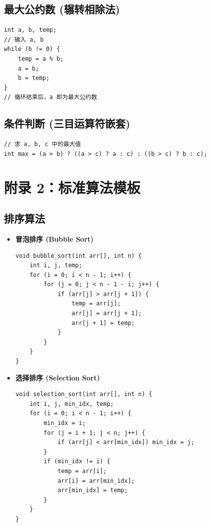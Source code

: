 \documentclass[a4paper,12pt]{article}
\begin{document}
\subsection{最大公约数 (辗转相除法)}
\begin{lstlisting}
int a, b, temp;
// 输入 a, b
while (b != 0) {
    temp = a % b;
    a = b;
    b = temp;
}
// 循环结束后，a 即为最大公约数
\end{lstlisting}

\subsection{条件判断 (三目运算符嵌套)}
\begin{lstlisting}
// 求 a, b, c 中的最大值
int max = (a > b) ? ((a > c) ? a : c) : ((b > c) ? b : c);
\end{lstlisting}

\section{附录 2：标准算法模板}
\label{sec:appendix_algo}

\subsection{排序算法}
\begin{itemize}
    \item \textbf{冒泡排序 (Bubble Sort)}
    \begin{lstlisting}
void bubble_sort(int arr[], int n) {
    int i, j, temp;
    for (i = 0; i < n - 1; i++) {
        for (j = 0; j < n - 1 - i; j++) {
            if (arr[j] > arr[j + 1]) {
                temp = arr[j];
                arr[j] = arr[j + 1];
                arr[j + 1] = temp;
            }
        }
    }
}
    \end{lstlisting}
    \item \textbf{选择排序 (Selection Sort)}
    \begin{lstlisting}
void selection_sort(int arr[], int n) {
    int i, j, min_idx, temp;
    for (i = 0; i < n - 1; i++) {
        min_idx = i;
        for (j = i + 1; j < n; j++) {
            if (arr[j] < arr[min_idx]) min_idx = j;
        }
        if (min_idx != i) {
            temp = arr[i];
            arr[i] = arr[min_idx];
            arr[min_idx] = temp;
        }
    }
}
    \end{lstlisting}
\end{itemize}
\end{document}
